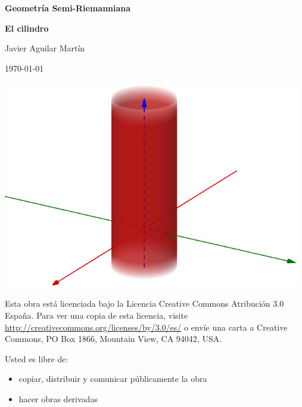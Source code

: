 \documentclass[twoside, 11pt]{article}
\theoremstyle{definition}
\begin{document}
\begin{titlepage}
	\centering
	{\huge\bfseries Geometría Semi-Riemanniana \par}
	\vspace{1cm}
	{\Huge\bfseries El cilindro \par}
	\vspace{1cm}
	{\Large Javier Aguilar Martín\par}
	\vspace{1cm}
	{\large \today\par}
	\vspace{1cm}
	\includegraphics[width=13cm]{cilindro.png}

\begin{abstract}
\normalsize
Este trabajo consiste en desarrollar un ejemplo en el que se repasan los principales conceptos sobre Variedades Diferenciables y Geometría Riemanniana, concretamente el cilindro. 
\end{abstract}




	\vfill
	{\small Esta obra está licenciada bajo la Licencia Creative Commons Atribución 3.0 España. Para ver una copia de esta licencia, visite \url{http://creativecommons.org/licenses/by/3.0/es/} o envíe una carta a Creative Commons, PO Box 1866, Mountain View, CA 94042, USA.

\bigskip

Usted es libre de:
\begin{itemize}
 \item copiar, distribuir y comunicar públicamente la obra
\item hacer obras derivadas
\end{itemize}

}
\end{titlepage}
\end{document}
